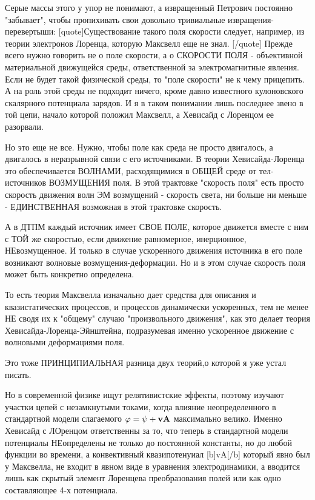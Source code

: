 \documentclass{article}
\begin{document}
Серые массы этого у упор не понимают, а извращенный Петрович постоянно "забывает", чтобы пропихивать свои довольно тривиальные извращения-перевертыши:
[quote]Существование такого поля скорости следует, например, из теории электронов Лоренца, которую Максвелл еще не знал. [/quote]
Прежде всего нужно говорить не о поле скорости, а о СКОРОСТИ ПОЛЯ - объективной материальной движущейся среды, ответственной за электромагнитные явления.
Если не будет такой физической среды, то "поле скорости" не к чему прицепить.
А на роль  этой среды не подходит ничего, кроме давно известного кулоновского скалярного потенциала зарядов.
И я в таком понимании лишь последнее звено в той цепи, начало которой положил Максвелл, а Хевисайд с Лоренцом ее разорвали.

Но это еще не все. Нужно, чтобы поле как среда не просто двигалось, а двигалось в неразрывной связи с его источниками.
В теории Хевисайда-Лоренца это обеспечивается ВОЛНАМИ, расходящимися в ОБЩЕЙ среде от тел-источников ВОЗМУЩЕНИЯ поля. В этой трактовке "скорость поля" есть просто скорость движения волн ЭМ возмущений - скорость света, ни больше ни меньше - ЕДИНСТВЕННАЯ возможная в этой трактовке скорость.

А в ДТПМ каждый источник имеет СВОЕ ПОЛЕ, которое движется вместе с ним  с ТОЙ же скоростью, если движение равномерное, инерционное, НЕвозмущенное.
И только в случае ускоренного движения источника в его поле возникают волновые возмущения-деформации. Но и в этом случае скорость поля может быть конкретно определена.

То есть теория Максвелла изначально дает средства для описания и квазистатических процессов, и процессов динамически ускоренных, тем не менее НЕ сводя их к "общему" случаю "произвольного движения", как это делает теория Хевисайда-Лоренца-Эйнштейна, подразумевая именно ускоренное движение с волновыми деформациями поля.

Это тоже ПРИНЦИПИАЛЬНАЯ разница двух теорий,о которой я уже устал писать.

Но в современной физике ищут релятивистские эффекты, поэтому изучают участки цепей с незамкнутыми токами, когда влияние неопределенного в стандартной модели слагаемого $\varphi=\psi+\bf v\bf A$ максимально велико. %
Именно Хевисайд с ЛОренцом ответственны за то, что теперь в стандартной модели потенциалы НЕопределены не только до постоянной константы, но до любой функции во времени, а конвективный квазипотенуиал [b]vA[/b] который явно был у Максвелла, не входит в явном виде в уравнения электродинамики, а вводится лишь как скрытый элемент Лоренцева преобразования полей или как одно составляющее 4-х потенциала.
\end{document}
